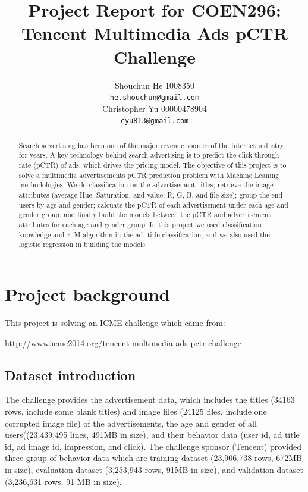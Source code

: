 \documentclass{article} %
\title{Project Report for COEN296: Tencent Multimedia Ads pCTR Challenge}
\author {
Shouchun He 1008350 \\
\texttt{he.shouchun@gmail.com} \\
\And
Christopher Yu 00000478904\\
\texttt{cyu813@gmail.com} \\
}
\begin{document}
\maketitle

\begin{abstract}
Search advertising has been one of the major revenue sources of the Internet industry for years. A key technology behind search advertising is to predict the click-through rate (pCTR) of ads, which drives the pricing model. The objective of this project is to solve a multimedia advertisements pCTR prediction problem with Machine Leaning methodologies: We do classification on the advertisement titles; retrieve the image attributes (average Hue, Saturation, and value, R, G, B, and file size);  group the end users by age and gender; calcuate the pCTR of each advertisement under each age and gender group; and finally build the models between the pCTR and advertisement attributes for each age and gender group. In this project we used classification knowledge and E-M algorithm in the ad. title classification, and we also used the logistic regression in building the models.
\end{abstract}

\section{Project background}

This project is solving an ICME challenge which came from:
\begin{center}
   \url{http://www.icme2014.org/tencent-multimedia-ads-pctr-challenge}
\end{center}

\subsection{Dataset introduction}
The challenge provides the advertisement data, which includes the titles (34163 rows, include some blank titles) and image files (24125 files, include one corrupted image file) of the advertisements, the age and gender of all users((23,439,495 lines, 491MB in size), and their behavior data (user id, ad title id, ad image id, impression, and click). The challenge sponsor (Tencent) provided three group of behavior data which are training dataset (23,906,738 rows, 672MB in size), evaluation dataset (3,253,943 rows, 91MB in size), and validation dataset (3,236,631 rows, 91 MB in size).
\end{document}
